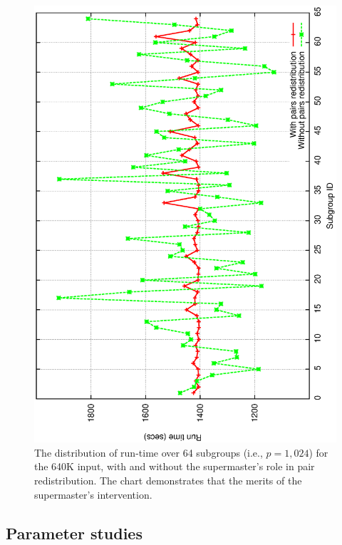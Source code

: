 \documentclass[10pt,journal,letterpaper,compsoc]{IEEEtran}
\begin{document}
\begin{figure}[h]
\centerline{
            \includegraphics[angle=-90, scale=0.33]{subgroups.eps}
}
\caption{
The distribution of run-time over 64 subgroups (i.e., $p=1,024$) for the 640K input, with and without the supermaster's role in pair redistribution. The chart demonstrates that the merits of the supermaster's intervention.
}
\label{figSPvalue}
\end{figure}

\newpage



\subsection{Parameter studies}
\label{secParameters}
\end{document}
